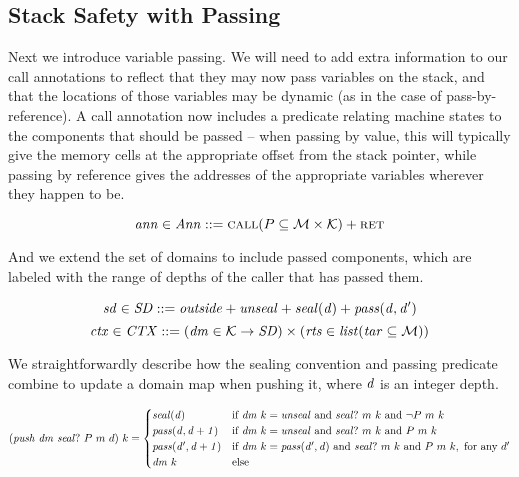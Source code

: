 \documentclass[acmsmall,review,anonymous]{acmart}\settopmatter{printfolios=true,printccs=false,printacmref=false}
\begin{document}
\subsection{Stack Safety with Passing}

Next we introduce variable passing. We will need to add extra information to our call
annotations to reflect that they may now pass variables on the stack, and that the locations
of those variables may be dynamic (as in the case of pass-by-reference).
A call annotation now includes a predicate relating machine states to the components
that should be passed -- when passing by value, this will typically give the memory cells
at the appropriate offset from the stack pointer, while passing by reference gives the
addresses of the appropriate variables wherever they happen to be.

\[\mathit{ann} \in \mathit{Ann} ::= \text{\sc call}(P \subseteq {\mathcal M} \times {\mathcal K}) + \text{\sc ret}\]

And we extend the set of domains to include passed components,
which are labeled with the range of depths of the caller that has passed them.

\[\mathit{sd} \in \mathit{SD} ::= \mathit{outside} + \mathit{unseal} + \mathit{seal(d)} + \mathit{pass(d,d')}\]
\[\mathit{ctx} \in \mathit{CTX} ::= (\mathit{dm} \in {\mathcal K} \rightarrow \mathit{SD})
\times (\mathit{rts} \in \mathit{list} (\mathit{tar} \subseteq {\mathcal M})) \]

We straightforwardly describe how the sealing convention and passing predicate combine to
update a domain map when pushing it, where \(d\) is an integer depth.

\[(\mathit{push} ~ \mathit{dm} ~ \mathit{seal?} ~ P ~ m ~ d) ~ k =
\begin{cases}
  \mathit{seal(d)}              & \text{if } \mathit{dm} ~ k = \mathit{unseal} \text{ and }
                                 \mathit{seal?} ~ m ~ k \text{ and } \neg P ~ m ~ k \\
  \mathit{pass(d,d+1)}     & \text{if } \mathit{dm} ~ k = \mathit{unseal} \text{ and }
                                 \mathit{seal?} ~ m ~ k \text{ and } P ~ m ~ k \\
  \mathit{pass(d',d+1)}    & \text{if } \mathit{dm} ~ k = \mathit{pass(d',d)} \text{ and }
                                 \mathit{seal?} ~ m ~ k \text{ and } P ~ m ~ k,
                                 \text{ for any } d' \\
  \mathit{dm}~k & \text{else} \\
\end{cases}\]
\end{document}
